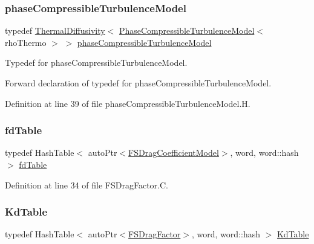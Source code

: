 \subsubsection{\texorpdfstring{phase\+Compressible\+Turbulence\+Model}{phaseCompressibleTurbulenceModel}}
{\footnotesize\ttfamily typedef \hyperlink{classFoam_1_1ThermalDiffusivity}{Thermal\+Diffusivity}$<$ \hyperlink{classFoam_1_1PhaseCompressibleTurbulenceModel}{Phase\+Compressible\+Turbulence\+Model}$<$ rho\+Thermo $>$ $>$ \hyperlink{namespaceFoam_a21fdbb0b53653a278781d894a16c8a88}{phase\+Compressible\+Turbulence\+Model}}



Typedef for phase\+Compressible\+Turbulence\+Model. 

Forward declaration of typedef for phase\+Compressible\+Turbulence\+Model.

\label{_Description}%
 

Definition at line 39 of file phase\+Compressible\+Turbulence\+Model.\+H.

\mbox{\label{namespaceFoam_a7760b746b5c75541218a8e6bcf18af90}} 
\subsubsection{\texorpdfstring{fd\+Table}{fdTable}}
{\footnotesize\ttfamily typedef Hash\+Table$<$ auto\+Ptr$<$\hyperlink{classFoam_1_1FSDragCoefficientModel}{F\+S\+Drag\+Coefficient\+Model}$>$, word, word\+::hash $>$ \hyperlink{namespaceFoam_a7760b746b5c75541218a8e6bcf18af90}{fd\+Table}}



Definition at line 34 of file F\+S\+Drag\+Factor.\+C.

\mbox{\label{namespaceFoam_a9fff7443e03586fe1171f2b48bf43ac0}} 
\subsubsection{\texorpdfstring{Kd\+Table}{KdTable}}
{\footnotesize\ttfamily typedef Hash\+Table$<$ auto\+Ptr$<$\hyperlink{classFoam_1_1FSDragFactor}{F\+S\+Drag\+Factor}$>$, word, word\+::hash $>$ \hyperlink{namespaceFoam_a9fff7443e03586fe1171f2b48bf43ac0}{Kd\+Table}}



